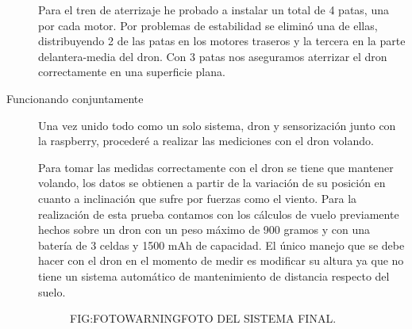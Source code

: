\begin{description}
Para el tren de aterrizaje he probado a instalar un total de 4 patas, una por cada motor. Por problemas de estabilidad se eliminó una de ellas, distribuyendo 2 de las patas en los motores traseros y la tercera en la parte delantera-media del dron. Con 3 patas nos aseguramos aterrizar el dron correctamente en una superficie plana.

\item[Funcionando conjuntamente]

Una vez unido todo como un solo sistema, dron y sensorización junto con la raspberry, procederé a realizar las mediciones con el dron volando.

Para tomar las medidas correctamente con el dron se tiene que mantener volando, los datos se obtienen a partir de la variación de su posición en cuanto a inclinación que sufre por fuerzas como el viento.
Para la realización de esta prueba contamos con los cálculos de vuelo previamente hechos sobre un dron con un peso máximo de 900 gramos y con una batería de 3 celdas y 1500 mAh de capacidad. El único manejo que se debe hacer con el dron en el momento de medir es modificar su altura ya que no tiene un sistema automático de mantenimiento de distancia respecto del suelo.

  \begin{figure}[Foto del dron con sensorización de viento]{FIG:FOTOWARNING}{FOTO DEL SISTEMA FINAL.}
\end{figure}


\end{description}

